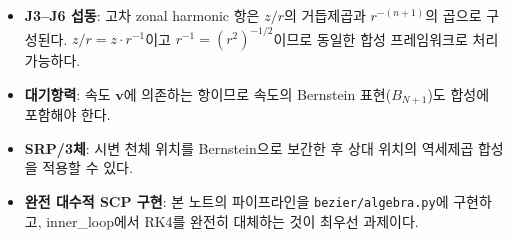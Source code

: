 \documentclass[11pt]{article}
\begin{document}
\begin{itemize}
  \item \textbf{J3--J6 섭동}: 고차 zonal harmonic 항은 $z/r$의 거듭제곱과
        $r^{-(n+1)}$의 곱으로 구성된다. $z/r = z \cdot r^{-1}$이고
        $r^{-1} = (r^2)^{-1/2}$이므로 동일한 합성 프레임워크로 처리 가능하다.
  \item \textbf{대기항력}: 속도 $\mathbf{v}$에 의존하는 항이므로
        속도의 Bernstein 표현($B_{N+1}$)도 합성에 포함해야 한다.
  \item \textbf{SRP/3체}: 시변 천체 위치를 Bernstein으로 보간한 후
        상대 위치의 역세제곱 합성을 적용할 수 있다.
  \item \textbf{완전 대수적 SCP 구현}: 본 노트의 파이프라인을
        \texttt{bezier/algebra.py}에 구현하고,
        inner\_loop에서 RK4를 완전히 대체하는 것이 최우선 과제이다.
\end{itemize}



\end{document}
